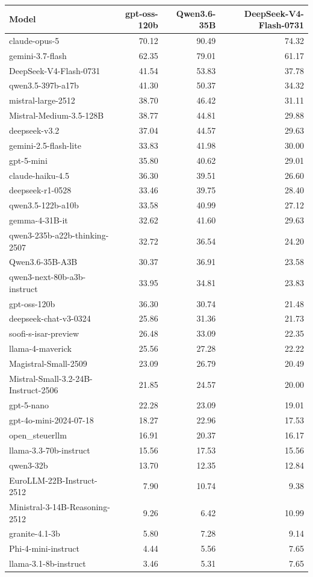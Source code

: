 \begin{tabular}{lrrr}
\toprule
Model & gpt-oss-120b & Qwen3.6-35B & DeepSeek-V4-Flash-0731 \\
\midrule
claude-opus-5 & 70.12 & 90.49 & 74.32 \\
gemini-3.7-flash & 62.35 & 79.01 & 61.17 \\
DeepSeek-V4-Flash-0731 & 41.54 & 53.83 & 37.78 \\
qwen3.5-397b-a17b & 41.30 & 50.37 & 34.32 \\
mistral-large-2512 & 38.70 & 46.42 & 31.11 \\
Mistral-Medium-3.5-128B & 38.77 & 44.81 & 29.88 \\
deepseek-v3.2 & 37.04 & 44.57 & 29.63 \\
gemini-2.5-flash-lite & 33.83 & 41.98 & 30.00 \\
gpt-5-mini & 35.80 & 40.62 & 29.01 \\
claude-haiku-4.5 & 36.30 & 39.51 & 26.60 \\
deepseek-r1-0528 & 33.46 & 39.75 & 28.40 \\
qwen3.5-122b-a10b & 33.58 & 40.99 & 27.12 \\
gemma-4-31B-it & 32.62 & 41.60 & 29.63 \\
qwen3-235b-a22b-thinking-2507 & 32.72 & 36.54 & 24.20 \\
Qwen3.6-35B-A3B & 30.37 & 36.91 & 23.58 \\
qwen3-next-80b-a3b-instruct & 33.95 & 34.81 & 23.83 \\
gpt-oss-120b & 36.30 & 30.74 & 21.48 \\
deepseek-chat-v3-0324 & 25.86 & 31.36 & 21.73 \\
soofi-s-isar-preview & 26.48 & 33.09 & 22.35 \\
llama-4-maverick & 25.56 & 27.28 & 22.22 \\
Magistral-Small-2509 & 23.09 & 26.79 & 20.49 \\
Mistral-Small-3.2-24B-Instruct-2506 & 21.85 & 24.57 & 20.00 \\
gpt-5-nano & 22.28 & 23.09 & 19.01 \\
gpt-4o-mini-2024-07-18 & 18.27 & 22.96 & 17.53 \\
open\_steuerllm & 16.91 & 20.37 & 16.17 \\
llama-3.3-70b-instruct & 15.56 & 17.53 & 15.56 \\
qwen3-32b & 13.70 & 12.35 & 12.84 \\
EuroLLM-22B-Instruct-2512 & 7.90 & 10.74 & 9.38 \\
Ministral-3-14B-Reasoning-2512 & 9.26 & 6.42 & 10.99 \\
granite-4.1-3b & 5.80 & 7.28 & 9.14 \\
Phi-4-mini-instruct & 4.44 & 5.56 & 7.65 \\
llama-3.1-8b-instruct & 3.46 & 5.31 & 7.65 \\
\bottomrule
\end{tabular}
